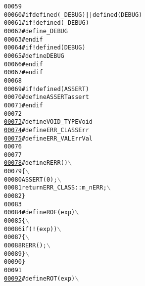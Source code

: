 \begin{footnotesize}
\begin{alltt}
00059 \textcolor{preprocessor}{}
00060 \textcolor{preprocessor}{#if defined( \_DEBUG ) || defined( DEBUG )}
00061 \textcolor{preprocessor}{}\textcolor{preprocessor}{#if !defined( \_DEBUG )}
00062 \textcolor{preprocessor}{}\textcolor{preprocessor}{#define \_DEBUG}
00063 \textcolor{preprocessor}{}\textcolor{preprocessor}{#endif}
00064 \textcolor{preprocessor}{}\textcolor{preprocessor}{#if !defined( DEBUG )}
00065 \textcolor{preprocessor}{}\textcolor{preprocessor}{#define DEBUG}
00066 \textcolor{preprocessor}{}\textcolor{preprocessor}{#endif}
00067 \textcolor{preprocessor}{}\textcolor{preprocessor}{#endif}
00068 \textcolor{preprocessor}{}
00069 \textcolor{preprocessor}{#if !defined( ASSERT )}
00070 \textcolor{preprocessor}{}\textcolor{preprocessor}{#define ASSERT assert}
00071 \textcolor{preprocessor}{}\textcolor{preprocessor}{#endif}
00072 \textcolor{preprocessor}{}
\hypertarget{_macros_8h_source_l00073}{}\hyperlink{_macros_8h_a94148a8f0433999362313f6de3584aae}{00073} \textcolor{preprocessor}{#define VOID\_TYPE Void}
\hypertarget{_macros_8h_source_l00074}{}\hyperlink{_macros_8h_aadbd2b4568a26ee06db85dca51693fa2}{00074} \textcolor{preprocessor}{}\textcolor{preprocessor}{#define ERR\_CLASS Err}
\hypertarget{_macros_8h_source_l00075}{}\hyperlink{_macros_8h_aa803bb0b2c462e8b1f60459dd1f54bc9}{00075} \textcolor{preprocessor}{}\textcolor{preprocessor}{#define ERR\_VAL   ErrVal}
00076 \textcolor{preprocessor}{}
00077 
\hypertarget{_macros_8h_source_l00078}{}\hyperlink{_macros_8h_ae88b38cb57ae15aaaf1672e10ca304d7}{00078} \textcolor{preprocessor}{#define RERR( )               \(\backslash\)}
00079 \textcolor{preprocessor}{\{                             \(\backslash\)}
00080 \textcolor{preprocessor}{        ASSERT( 0 );              \(\backslash\)}
00081 \textcolor{preprocessor}{        return ERR\_CLASS::m\_nERR; \(\backslash\)}
00082 \textcolor{preprocessor}{        \}}
00083 \textcolor{preprocessor}{}
\hypertarget{_macros_8h_source_l00084}{}\hyperlink{_macros_8h_ad8e4813ce173a7ec21799102f8896d05}{00084} \textcolor{preprocessor}{#define ROF( exp )            \(\backslash\)}
00085 \textcolor{preprocessor}{\{                             \(\backslash\)}
00086 \textcolor{preprocessor}{        if( !( exp ) )              \(\backslash\)}
00087 \textcolor{preprocessor}{\{                           \(\backslash\)}
00088 \textcolor{preprocessor}{        RERR();                   \(\backslash\)}
00089 \textcolor{preprocessor}{        \}                           \(\backslash\)}
00090 \textcolor{preprocessor}{        \}}
00091 \textcolor{preprocessor}{}
\hypertarget{_macros_8h_source_l00092}{}\hyperlink{_macros_8h_a20bc3cd3d27f9df13cc189d67473018d}{00092} \textcolor{preprocessor}{#define ROT( exp )            \(\backslash\)}

\end{alltt}
\end{footnotesize}
